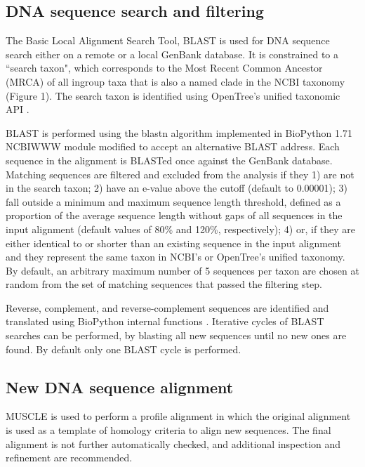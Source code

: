 \documentclass{bmcart}
\begin{document}
\subsection*{DNA sequence search and filtering}

The Basic Local Alignment Search Tool, BLAST \cite{altschul1990basic} is used for DNA
sequence search either on a remote or a local GenBank database. It is constrained to a
 ``search taxon", which corresponds to the Most Recent Common Ancestor (MRCA) of
all ingroup taxa that is also a named clade in the NCBI taxonomy (Figure 1). The
search taxon is identified using OpenTree's unified taxonomic API \cite{mrcaAPI}.

BLAST is performed using the blastn algorithm \cite{camacho2009blast}
implemented in BioPython 1.71 \cite{cock2009biopython} NCBIWWW module \cite{ncbiwww}
modified to accept an alternative BLAST address.
Each sequence in the alignment is BLASTed once against the GenBank database.
Matching sequences are filtered and excluded from the analysis if they 1) are not in the search taxon;
2) have an e-value above the cutoff (default to 0.00001); 3) fall outside a minimum
and maximum sequence length threshold, defined as a proportion of the average sequence length without
gaps of all sequences in the input alignment (default values of 80\% and 120\%,
respectively); 4) or, if they are either identical to or shorter than an existing
sequence in the input alignment and they represent the same taxon in NCBI's or
OpenTree's unified taxonomy.
By default, an arbitrary maximum number of 5 sequences per taxon are chosen at random
from the set of matching sequences that passed the filtering step.

Reverse, complement, and reverse-complement sequences are identified and translated
using BioPython internal functions \cite{cock2009biopython}.
Iterative cycles of BLAST searches can be performed, by blasting all new sequences
until no new ones are found. By default only one BLAST cycle is performed.

\subsection*{New DNA sequence alignment}

MUSCLE \cite{edgar2004muscle} is used to perform a profile alignment in which the
original alignment is used as a template of homology criteria to align new sequences.
The final alignment is not further automatically checked, and additional inspection
and refinement are recommended.
\end{document}
